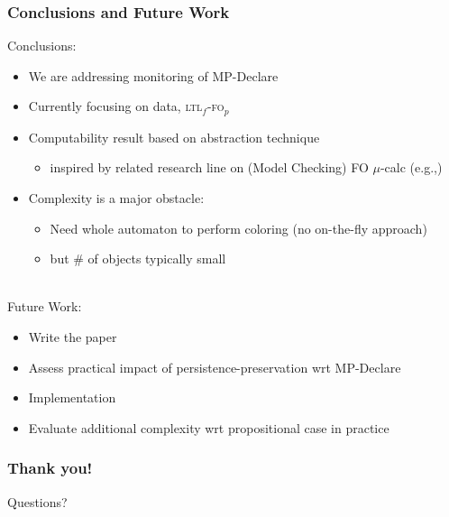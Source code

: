 \documentclass[xcolor=dvipsnames]{beamer}
\newcommand{\ltlf}{\textsc{ltl}$_f$\xspace}
\newcommand{\ltlffop}{\ltlf-\textsc{fo}$_p$\xspace}
\begin{document}

\begin{frame}
\frametitle{Conclusions and Future Work}

Conclusions:
\begin{itemize}
	\item We are addressing monitoring of MP-Declare
	\item Currently focusing on data, \ltlffop
	\item Computability result based on abstraction technique
		\begin{itemize}
			\item inspired by related research line on (Model Checking) FO $\mu$-calc (e.g.,\cite{AIJ16,IC18})
		\end{itemize}
	\item Complexity is a major obstacle: 
		\begin{itemize}
			\item Need whole automaton to perform coloring (no on-the-fly approach)
			\item but \# of objects typically small
		\end{itemize}
\end{itemize}

~\\

Future Work:
	\begin{itemize}
		\item Write the paper \smiley
		\item Assess practical impact of persistence-preservation wrt MP-Declare
		\item Implementation
		\item Evaluate additional complexity wrt propositional case in practice
	\end{itemize}




\end{frame}


\begin{frame}
\frametitle{Thank you!}
\begin{center}
\begin{huge}
Questions?
\end{huge}
\end{center}
\end{frame}
\end{document}

